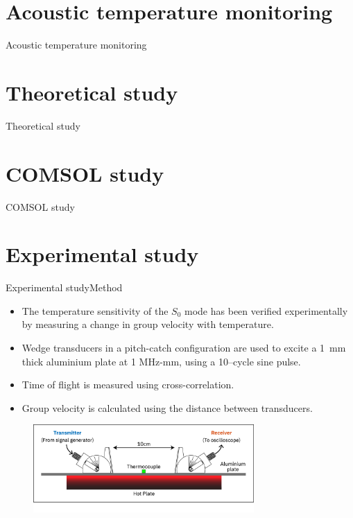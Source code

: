 \documentclass[aspectratio=169, 9pt]{beamer}
\begin{document}

\section{Acoustic temperature monitoring}
\begin{frame}{Acoustic temperature monitoring}

\end{frame}


\section{Theoretical study}
\begin{frame}{Theoretical study}

\end{frame}


\section{COMSOL study}
\begin{frame}{COMSOL study}

\end{frame}


\section{Experimental study}
\begin{frame}{Experimental study}{Method}

\begin{itemize}
  \item The temperature sensitivity of the $S_0$ mode has been verified experimentally by measuring a change in group velocity with temperature.
  \item Wedge transducers in a pitch-catch configuration are used to excite a 1~mm thick aluminium plate at 1 MHz-mm, using a 10--cycle sine pulse. 
  \item Time of flight is measured using cross-correlation.
  \item Group velocity is calculated using the distance between transducers.
\end{itemize}

  \begin{figure}[h]
    \centering
    \includegraphics[width=0.75\textwidth]{images/testdiagramsimple.eps}
    \end{figure}
\end{frame}
\end{document}
